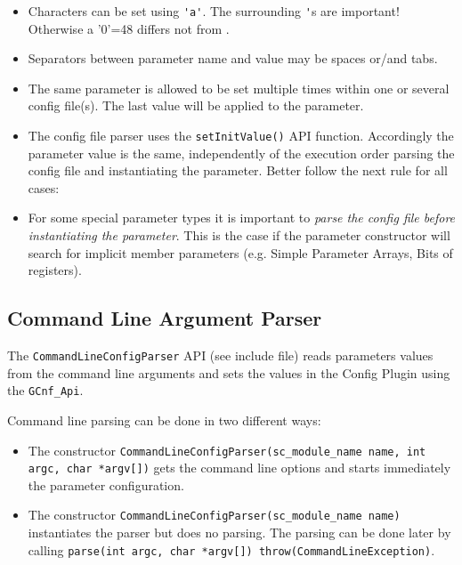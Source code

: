\begin{itemize}
  \item Characters can be set using \lstinline|'a'|. \newline
      The surrounding \lstinline|'|s are important! Otherwise a {\sffamily '0'=48} differs not from {}.
  \item Separators between parameter name and value may be spaces or/and tabs.
  \item The same parameter is allowed to be set multiple times within one or several config file(s). The last value will be applied to the parameter.
  \item The config file parser uses the \lstinline|setInitValue()| API function. Accordingly the parameter value is the same, independently of the execution order parsing the config file and instantiating the parameter. Better follow the next rule for all cases:
  \item For some special parameter types it is important to {\em parse the config file before instantiating the parameter}. This is the case if the parameter constructor will search for implicit member parameters (e.g. Simple Parameter Arrays, Bits of \GreenDev registers).
\end{itemize}


\subsection{Command Line Argument Parser}
\label{CommandLineConfigParser}

The \lstinline|CommandLineConfigParser| API (see include file) reads parameters values from the command line arguments and sets the values in the Config Plugin using the \lstinline|GCnf_Api|.

Command line parsing can be done in two different ways:
\begin{itemize}
	\item The constructor \mbox{\lstinline|CommandLineConfigParser(sc_module_name name, int argc, char *argv[])|} gets the command line options and starts immediately the parameter configuration.
	\item The constructor \lstinline|CommandLineConfigParser(sc_module_name name)| instantiates the parser but does no parsing. The parsing can be done later by calling \mbox{\lstinline|parse(int argc, char *argv[]) throw(CommandLineException)|}.
\end{itemize}

